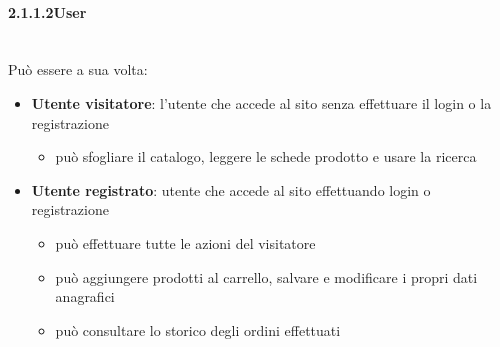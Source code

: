 \documentclass[11pt,a4paper]{article}
\newcommand{\subsubsubsection}[1]{\paragraph{#1}\mbox{}\\}
\begin{document}
\subsubsubsection{2.1.1.2\quad User}
Pu\`o essere a sua volta:
\begin{itemize}
  \item \textbf{Utente visitatore}: l'utente che accede al sito senza effettuare il login o la registrazione
  \begin{itemize}
    \item pu\`o sfogliare il catalogo, leggere le schede prodotto e usare la ricerca
  \end{itemize}
  \item \textbf{Utente registrato}: utente che accede al sito effettuando login o registrazione
  \begin{itemize}
    \item pu\`o effettuare tutte le azioni del visitatore
    \item pu\`o aggiungere prodotti al carrello, salvare e modificare i propri dati anagrafici
    \item pu\`o consultare lo storico degli ordini effettuati
  \end{itemize}
\end{itemize}
\end{document}
